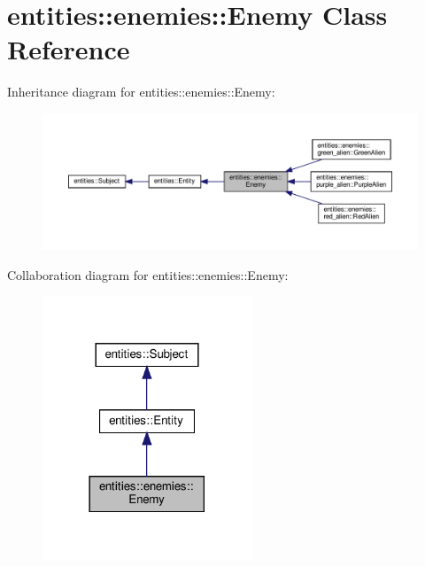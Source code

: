 \hypertarget{classentities_1_1enemies_1_1Enemy}{}\section{entities\+:\+:enemies\+:\+:Enemy Class Reference}
\label{classentities_1_1enemies_1_1Enemy}


Inheritance diagram for entities\+:\+:enemies\+:\+:Enemy\+:\nopagebreak
\begin{figure}[H]
\begin{center}
\leavevmode
\includegraphics[width=350pt]{classentities_1_1enemies_1_1Enemy__inherit__graph}
\end{center}
\end{figure}


Collaboration diagram for entities\+:\+:enemies\+:\+:Enemy\+:\nopagebreak
\begin{figure}[H]
\begin{center}
\leavevmode
\includegraphics[width=177pt]{classentities_1_1enemies_1_1Enemy__coll__graph}
\end{center}
\end{figure}
